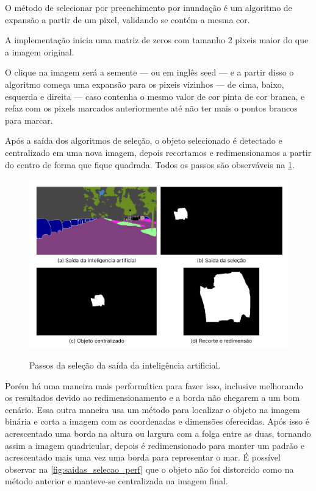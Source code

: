 O método de  selecionar por preenchimento por inundação é um algoritmo de expansão a partir de um pixel, validando se contém a mesma cor.

A implementação inicia uma matriz de zeros com tamanho 2 pixeis maior do que a imagem original.

O clique na  imagem será a semente — ou em inglês  seed — e a partir disso o algoritmo começa uma expansão para os pixeis vizinhos — de cima, baixo, esquerda e direita — caso contenha o mesmo valor de cor pinta de cor branca, e refaz com os pixels marcados  anteriormente até não ter mais o pontos brancos para marcar.


Após a saída dos algoritmos de seleção, o objeto selecionado é detectado e centralizado em uma nova imagem, depois recortamos e redimensionamos a partir do centro de forma que fique quadrada. Todos os passos são observáveis na \cref{fig:saidas_selecao}.

\begin{figure}[!ht]
	\centering
    \caption{Passos da seleção da saída da inteligência  artificial.}
	\includegraphics[width=1.0\textwidth]{figures/saidas_selecao.png}
	\label{fig:saidas_selecao}
\end{figure}

Porém há uma maneira mais performática para fazer isso, inclusive melhorando os resultados devido ao redimensionamento e a borda não chegarem a um bom cenário. Essa outra maneira usa um método para localizar o objeto na imagem binária e corta a imagem com as coordenadas e dimensões oferecidas. Após isso é acrescentado uma borda na altura ou largura com a folga entre as duas, tornando assim a imagem quadricular, depois é redimensionado para manter um padrão e acrescentado mais uma vez uma borda para representar o mar. É possível observar na \cref{fig:saidas_selecao_perf} que o objeto não foi distorcido como na método anterior e manteve-se centralizada na imagem final.

